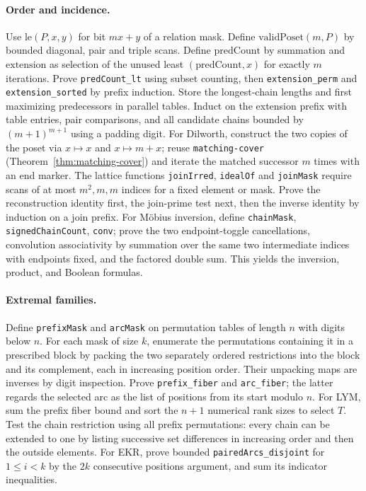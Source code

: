 \paragraph{Order and incidence.}
Use \(\mathrm{le}(P,x,y)\) for bit \(mx+y\) of a relation mask.
Define \(\mathrm{validPoset}(m,P)\) by bounded diagonal, pair and
triple scans. Define \(\mathrm{predCount}\) by summation and
\(\mathrm{extension}\) as selection of the unused least
\((\mathrm{predCount},x)\) for exactly \(m\) iterations.
Prove \texttt{predCount\_lt} using subset counting, then
\texttt{extension\_perm} and \texttt{extension\_sorted} by prefix
induction. Store the longest-chain lengths and first maximizing predecessors
in parallel tables. Induct on the extension prefix with table entries,
pair comparisons, and all candidate chains bounded by
\((m+1)^{m+1}\) using a padding digit. For Dilworth, construct the two
copies of the poset via \(x\mapsto x\) and \(x\mapsto m+x\); reuse
\texttt{matching-cover} (Theorem~\ref{thm:matching-cover}) and iterate the
matched successor \(m\) times with an end marker.
The lattice functions \texttt{joinIrred}, \texttt{idealOf} and
\texttt{joinMask} require scans of at most \(m^2, m,m\) indices for a
fixed element or mask. Prove the reconstruction identity first, the
join-prime test next, then the inverse identity by induction on a join
prefix. For M\"obius inversion, define \texttt{chainMask},
\texttt{signedChainCount}, \texttt{conv}; prove the two endpoint-toggle
cancellations, convolution associativity by summation over the same two
intermediate indices with endpoints fixed, and the factored double sum. This yields the inversion,
product, and Boolean formulas.

\paragraph{Extremal families.}
Define \texttt{prefixMask} and \texttt{arcMask} on permutation tables
of length \(n\) with digits below \(n\). For each mask of size \(k\), enumerate
the permutations containing it in a prescribed block by packing the two
separately ordered restrictions into the block and its complement, each
in increasing position order. Their unpacking maps are inverses by
digit inspection. Prove \texttt{prefix\_fiber} and
\texttt{arc\_fiber}; the latter regards the selected arc as the list
of positions from its start modulo \(n\). For LYM, sum the prefix
fiber bound and sort the \(n+1\) numerical rank sizes to select \(T\).
Test the chain restriction using all prefix permutations: every chain
can be extended to one by listing successive set differences in increasing
order and then the outside elements. For EKR, prove bounded
\texttt{pairedArcs\_disjoint} for \(1\le i<k\) by the \(2k\) consecutive
positions argument, and sum its indicator inequalities.

